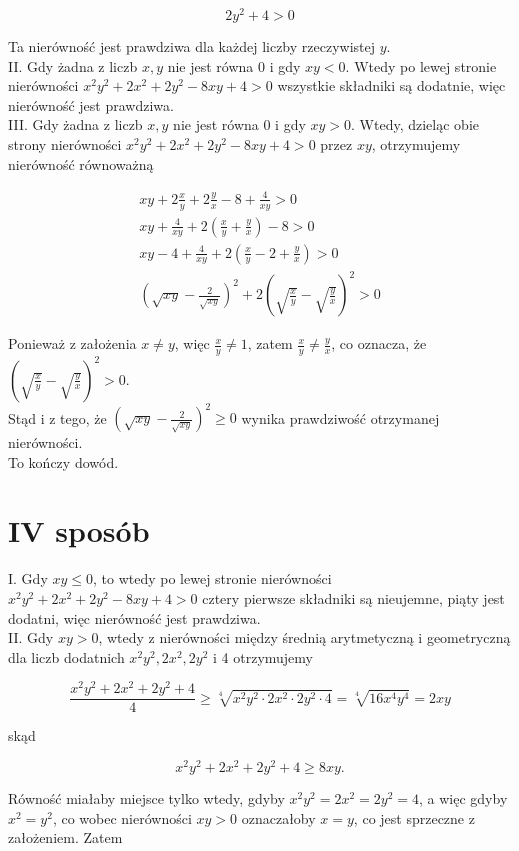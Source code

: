 \documentclass[10pt]{article}
\begin{document}
$$
2 y^{2}+4>0
$$

Ta nierówność jest prawdziwa dla każdej liczby rzeczywistej $y$.\\
II. Gdy żadna z liczb $x, y$ nie jest równa 0 i gdy $x y<0$. Wtedy po lewej stronie nierówności $x^{2} y^{2}+2 x^{2}+2 y^{2}-8 x y+4>0$ wszystkie składniki są dodatnie, więc nierówność jest prawdziwa.\\
III. Gdy żadna z liczb $x, y$ nie jest równa 0 i gdy $x y>0$. Wtedy, dzieląc obie strony nierówności $x^{2} y^{2}+2 x^{2}+2 y^{2}-8 x y+4>0$ przez $x y$, otrzymujemy nierówność równoważną

$$
\begin{gathered}
x y+2 \frac{x}{y}+2 \frac{y}{x}-8+\frac{4}{x y}>0 \\
x y+\frac{4}{x y}+2\left(\frac{x}{y}+\frac{y}{x}\right)-8>0 \\
x y-4+\frac{4}{x y}+2\left(\frac{x}{y}-2+\frac{y}{x}\right)>0 \\
\left(\sqrt{x y}-\frac{2}{\sqrt{x y}}\right)^{2}+2\left(\sqrt{\frac{x}{y}}-\sqrt{\frac{y}{x}}\right)^{2}>0
\end{gathered}
$$

Ponieważ z założenia $x \neq y$, więc $\frac{x}{y} \neq 1$, zatem $\frac{x}{y} \neq \frac{y}{x}$, co oznacza, że $\left(\sqrt{\frac{x}{y}}-\sqrt{\frac{y}{x}}\right)^{2}>0$.\\
Stąd i z tego, że $\left(\sqrt{x y}-\frac{2}{\sqrt{x y}}\right)^{2} \geq 0$ wynika prawdziwość otrzymanej nierówności.\\
To kończy dowód.

\section*{IV sposób}
I. Gdy $x y \leq 0$, to wtedy po lewej stronie nierówności $x^{2} y^{2}+2 x^{2}+2 y^{2}-8 x y+4>0$ cztery pierwsze składniki są nieujemne, piąty jest dodatni, więc nierówność jest prawdziwa.\\
II. Gdy $x y>0$, wtedy z nierówności między średnią arytmetyczną i geometryczną dla liczb dodatnich $x^{2} y^{2}, 2 x^{2}, 2 y^{2}$ i 4 otrzymujemy

$$
\frac{x^{2} y^{2}+2 x^{2}+2 y^{2}+4}{4} \geq \sqrt[4]{x^{2} y^{2} \cdot 2 x^{2} \cdot 2 y^{2} \cdot 4}=\sqrt[4]{16 x^{4} y^{4}}=2 x y
$$

skąd

$$
x^{2} y^{2}+2 x^{2}+2 y^{2}+4 \geq 8 x y .
$$

Równość miałaby miejsce tylko wtedy, gdyby $x^{2} y^{2}=2 x^{2}=2 y^{2}=4$, a więc gdyby $x^{2}=y^{2}$, co wobec nierówności $x y>0$ oznaczałoby $x=y$, co jest sprzeczne z założeniem. Zatem
\end{document}
